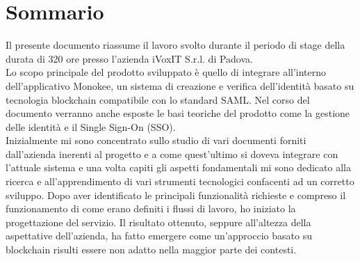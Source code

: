 
\cleardoublepage
{}
{}
\begingroup
\let\clearpage\relax
\let\cleardoublepage\relax
\let\cleardoublepage\relax

\chapter*{Sommario}

Il presente documento riassume il lavoro svolto durante il periodo di stage della durata
di 320 ore presso l’azienda iVoxIT S.r.l. di Padova.\\
Lo scopo principale del prodotto sviluppato è quello di integrare all'interno dell'applicativo Monokee, un sistema di creazione e verifica dell'identità basato su tecnologia blockchain compatibile con lo standard SAML. 
Nel corso del documento verranno anche esposte le basi teoriche del prodotto come la gestione delle identità e il Single Sign-On (SSO).\\
Inizialmente mi sono concentrato sullo studio di vari documenti forniti dall'azienda inerenti al progetto e a come quest'ultimo si doveva integrare con l'attuale sistema e
una volta capiti gli aspetti fondamentali mi sono dedicato alla ricerca e all'apprendimento di vari strumenti tecnologici
confacenti ad un corretto sviluppo.                 
Dopo aver identificato le principali funzionalità richieste e compreso il funzionamento di come erano definiti i flussi di lavoro, ho iniziato la progettazione del servizio.
Il risultato ottenuto, seppure all’altezza della aspettative dell’azienda, ha fatto emergere come un'approccio basato su blockchain risulti essere non adatto nella maggior parte dei contesti.


%
%

\endgroup			

\vfill

